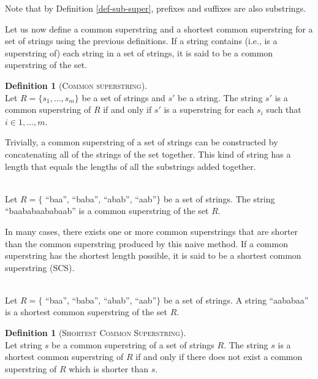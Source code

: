 \documentclass[english,twoside,censored,csm,algorithms-track-2020]{HYthesisML}
\theoremstyle{plain}
\theoremstyle{definition}
\newtheorem{definition}[theorem]{Definition}
\begin{document}
Note that by Definition \ref{def-sub-super}, prefixes and suffixes are also substrings.

Let us now define a common superstring and a shortest common superstring for a set of strings
using the previous definitions.
If a string contains (i.e., is a superstring of) each string in a set of strings, it is said to be
a common superstring of the set.

\begin{definition}[\textsc{Common superstring}]~\label{def-cs}\\
  Let $R = \{s_1,...,s_m\}$ be a set of strings and $s'$ be a string.
  The string $s'$ is a common superstring of $R$ if and only if $s'$ is a superstring
  for each $s_i$ such that $i\in 1,...,m$.
\end{definition}

Trivially, a common superstring of a set of strings can be constructed by concatenating all of
the strings of the set together.
This kind of string has a length that equals the lengths of all the substrings added together.

\begin{testexample}~\label{exml-cs}\\
  Let $R=\{$ ``baa'', ``baba'', ``abab'', ``aab''$\}$ be a set of strings.
  The string ``baababaababaab'' is a common superstring of the set $R$.
\end{testexample}

In many cases, there exists one or more common superstrings that are shorter than the common
superstring produced by this naive method.
If a common superstring has the shortest length possible, it is said to be a shortest common superstring (SCS).

\begin{testexample}~\label{exml-scs}\\
  Let $R=\{$ ``baa'', ``baba'', ``abab'', ``aab''$\}$ be a set of strings.
  A string ``aababaa'' is a shortest common superstring of the set $R$.
\end{testexample}

\begin{definition}[\textsc{Shortest Common Superstring}]~\label{def-scs}\\
  Let string $s$ be a common superstring of a set of strings $R$.
  The string $s$ is a shortest common superstring of $R$ if and only if there does not exist
  a common superstring of $R$ which is shorter than $s$.
\end{definition}
\end{document}
